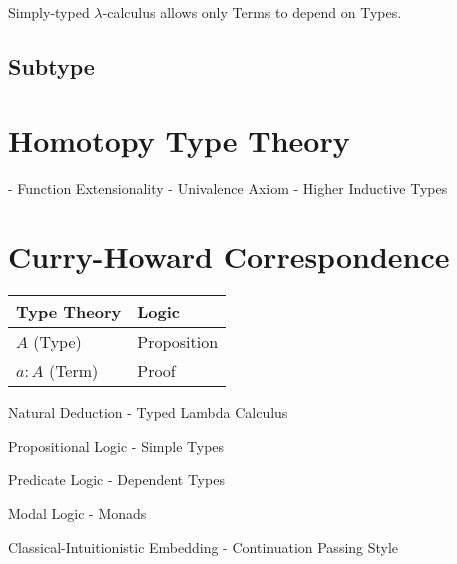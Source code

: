 Simply-typed $\lambda$-calculus allows only Terms to depend on Types.



\subsection{Subtype}\label{subsec:subtype}



\section{Homotopy Type Theory}\label{sec:homotopy_type}

- Function Extensionality
- Univalence Axiom
- Higher Inductive Types



\section{Curry-Howard Correspondence}\label{sec:curry_howard}

\begin{tabular}{| l | l |}
\hline
\textbf{Type Theory} & \textbf{Logic} \\ \hline \hline
$A$ (Type) & Proposition \\ \hline
$a : A$ (Term) & Proof \\
\hline
\end{tabular}

Natural Deduction - Typed Lambda Calculus

Propositional Logic - Simple Types

Predicate Logic - Dependent Types

Modal Logic - Monads

Classical-Intuitionistic Embedding - Continuation Passing Style


